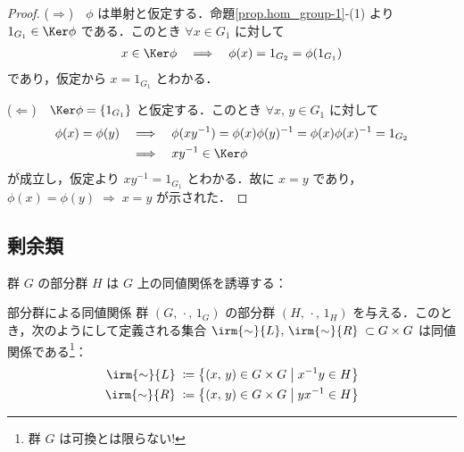 \documentclass[geometry_main]{subfiles}
\begin{document}
\begin{proof}
	($\Longrightarrow$)　$\phi$ は単射と仮定する．命題\ref{prop.hom_group-1}-(1) より $1_{G_1} \in \Ker \phi$ である．このとき $\forall x \in G_1$ に対して
	\begin{align}
		x \in \Ker \phi \quad \Longrightarrow \quad \phi(x) = 1_{G_2} = \phi(1_{G_1})
	\end{align}
	であり，仮定から $x = 1_{G_1}$ とわかる．
	
	($\Longleftarrow$)　$\Ker \phi = \{1_{G_1}\}$ と仮定する．このとき $\forall x,\, y \in G_1$ に対して 
	\begin{align}
		\phi(x) = \phi(y) \quad &\Longrightarrow \quad \phi(xy^{-1}) = \phi(x) \phi(y)^{-1} = \phi(x) \phi(x)^{-1} = 1_{G_2} \\
		&\Longrightarrow \quad  xy^{-1} \in \Ker \phi
	\end{align}
	が成立し，仮定より $xy^{-1} = 1_{G_1}$ とわかる．故に $x = y$ であり，$\phi(x) = \phi(y) \; \Longrightarrow \; x = y$ が示された．
\end{proof}

\subsection{剰余類}

群 $G$ の部分群 $H$ は $G$ 上の同値関係を誘導する：

\begin{myprop}[]{部分群による同値関係}
	群 $(G,\, \cdot\mathrel{},\, 1_G)$ の部分群 $(H,\, \cdot\mathrel{},\, 1_H)$ を与える．このとき，次のようにして定義される集合 $\irm{\mathord{\sim}}{L},\, \irm{\mathord{\sim}}{R}\; \subset G \times G$ は同値関係である\footnote{群 $G$ は可換とは限らない!}：
	\begin{align}
		\irm{\mathord{\sim}}{L} \; &\coloneqq \bigl\{ (x,\, y) \in G \times G \bigm| x^{-1} y \in H \bigr\} \\
		\irm{\mathord{\sim}}{R} \; &\coloneqq \bigl\{ (x,\, y) \in G \times G \bigm| y x^{-1} \in H \bigr\}
	\end{align}
\end{myprop}
\end{document}
